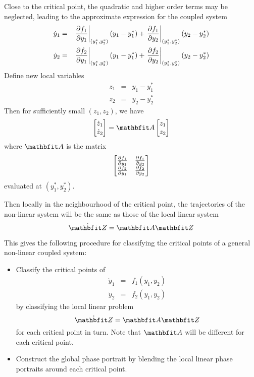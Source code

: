 Close to the critical point, the quadratic and higher order terms may be
neglected, leading to the approximate expression for the coupled system
\begin{eqnarray*}
\dot{y}_1&=&\left.\frac{\partial f_1}{\partial y_1}\right|_{(y_1^*,y_2^*)}(y_1-y_1^*)
+\left.\frac{\partial f_1}{\partial y_2}\right|_{(y_1^*,y_2^*)}(y_2-y_2^*)\\
\dot{y}_2&=&\left.\frac{\partial f_2}{\partial y_1}\right|_{(y_1^*,y_2^*)}(y_1-y_1^*)
+\left.\frac{\partial f_2}{\partial y_2}\right|_{(y_1^*,y_2^*)}(y_2-y_2^*)
\end{eqnarray*}
Define new local variables
\begin{eqnarray*}
z_1&=&y_1-y_1^*\\
z_2&=&y_2-y_2^*
\end{eqnarray*}
Then for sufficiently small $(z_1,z_2)$, we have
$$\begin{bmatrix} \dot{z}_1 \\ \dot{z}_2\end{bmatrix} =	\vect{A}
\begin{bmatrix} z_1 \\ z_2\end{bmatrix}$$
where $\vect{A}$ is the matrix
$$\begin{bmatrix} \frac{\partial f_1}{\partial y_1} & \frac{\partial f_1}{\partial y_2} \\
\frac{\partial f_2}{\partial y_1} & \frac{\partial f_2}{\partial y_2}\end{bmatrix}$$
evaluated at $(y_1^*,y_2^*)$.

Then locally in the neighbourhood of the critical point, the trajectories of
the non-linear system will be the same as those of the local linear system
$$\dot{\vect{Z}}=\vect{A}\vect{Z}$$

This gives the following procedure for classifying the critical points of a
general non-linear coupled system:
\begin{itemize}
\item Classify the critical points of
\begin{eqnarray*}
\dot{y}_1&=&f_1(y_1,y_2)\\
\dot{y}_2&=&f_2(y_1,y_2)
\end{eqnarray*}
by classifying the local linear problem
$$\dot{\vect{Z}}=\vect{A}\vect{Z}$$
for each critical point in turn.  Note that $\vect{A}$ will be different for each
critical point.
\item Construct the global phase portrait by blending the local linear phase
portraits around each critical point.
\end{itemize}


